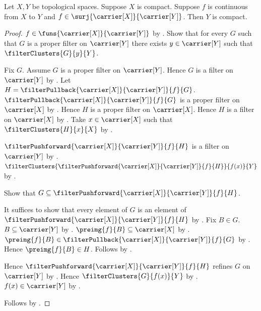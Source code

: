 \begin{theorem}\label{continuous_surjective_image_is_compact}
    Let $X,Y$ be topological spaces.
    Suppose $X$ is compact.
    Suppose $f$ is continuous from $X$ to $Y$ and
        $f\in\surj{\carrier[X]}{\carrier[Y]}$.
    Then $Y$ is compact.
\end{theorem}
\begin{proof}
    $f\in\funs{\carrier[X]}{\carrier[Y]}$ by
        .
    Show that for every $G$ such that
        $G$ is a proper filter on $\carrier[Y]$ there exists
        $y\in\carrier[Y]$ such that $\filterClusters{G}{y}{Y}$.
    \begin{subproof}
        Fix $G$.
        Assume $G$ is a proper filter on $\carrier[Y]$.
        Hence $G$ is a filter on $\carrier[Y]$ by
            .
        Let $H=\filterPullback{\carrier[X]}{\carrier[Y]}{f}{G}$.
        $\filterPullback{\carrier[X]}{\carrier[Y]}{f}{G}$ is a proper
            filter on $\carrier[X]$ by
            .
        Hence $H$ is a proper filter on $\carrier[X]$.
        Hence $H$ is a filter on $\carrier[X]$ by
            .
        Take $x\in\carrier[X]$ such that
            $\filterClusters{H}{x}{X}$ by
            .

        $\filterPushforward{\carrier[X]}{\carrier[Y]}{f}{H}$ is a filter
            on $\carrier[Y]$ by
            .
        $\filterClusters{
            \filterPushforward{\carrier[X]}{\carrier[Y]}{f}{H}
        }{f(x)}{Y}$ by
            .

        Show that $G\subseteq
            \filterPushforward{\carrier[X]}{\carrier[Y]}{f}{H}$.
        \begin{subproof}
            It suffices to show that every element of $G$ is an element of
                $\filterPushforward{\carrier[X]}{\carrier[Y]}{f}{H}$ by
                .
            Fix $B\in G$.
            $B\subseteq\carrier[Y]$ by .
            $\preimg{f}{B}\subseteq\carrier[X]$ by
                .
            $\preimg{f}{B}\in
                \filterPullback{\carrier[X]}{\carrier[Y]}{f}{G}$ by
                .
            Hence $\preimg{f}{B}\in H$.
            Follows by .
        \end{subproof}
        Hence $\filterPushforward{\carrier[X]}{\carrier[Y]}{f}{H}$
            refines $G$ on $\carrier[Y]$ by .
        Hence $\filterClusters{G}{f(x)}{Y}$ by
            .
        $f(x)\in\carrier[Y]$ by .
    \end{subproof}
    Follows by .
\end{proof}

